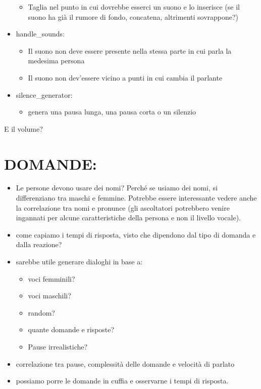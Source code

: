 \documentclass[
]{article}
\providecommand{\tightlist}{%
  \setlength{\itemsep}{0pt}\setlength{\parskip}{0pt}}
\begin{document}
\begin{itemize}
  \begin{itemize}
  \tightlist
  \item
    Taglia nel punto in cui dovrebbe esserci un suono e lo inserisce (se il suono ha già il rumore di fondo, concatena, altrimenti sovrappone?)
  \end{itemize}
\item
  handle\_sounds:

  \begin{itemize}
  \tightlist
  \item
    Il suono non deve essere presente nella stessa parte in cui parla la medesima persona
  \item
    Il suono non dev'essere vicino a punti in cui cambia il parlante
  \end{itemize}
\item
  silence\_generator:

  \begin{itemize}
  \tightlist
  \item
    genera una pausa lunga, una pausa corta o un silenzio
  \end{itemize}
\end{itemize}

E il volume?

\section{DOMANDE:}\label{domande}

\begin{itemize}
\tightlist
\item
  Le persone devono usare dei nomi? Perché se usiamo dei nomi, si differenziano tra maschi e femmine. Potrebbe essere interessante vedere anche la correlazione tra nomi e pronunce (gli ascoltatori potrebbero venire ingannati per alcune caratteristiche della persona e non il livello vocale).
\item
  come capiamo i tempi di risposta, visto che dipendono dal tipo di domanda e dalla reazione?
\item
  sarebbe utile generare dialoghi in base a:

  \begin{itemize}
  \tightlist
  \item
    voci femminili?
  \item
    voci maschili?
  \item
    random?
  \item
    quante domande e risposte?
  \item
    Pause irrealistiche?
  \end{itemize}
\item
  correlazione tra pause, complessità delle domande e velocità di parlato
\item
  possiamo porre le domande in cuffia e osservarne i tempi di risposta.
\end{itemize}
\end{document}
